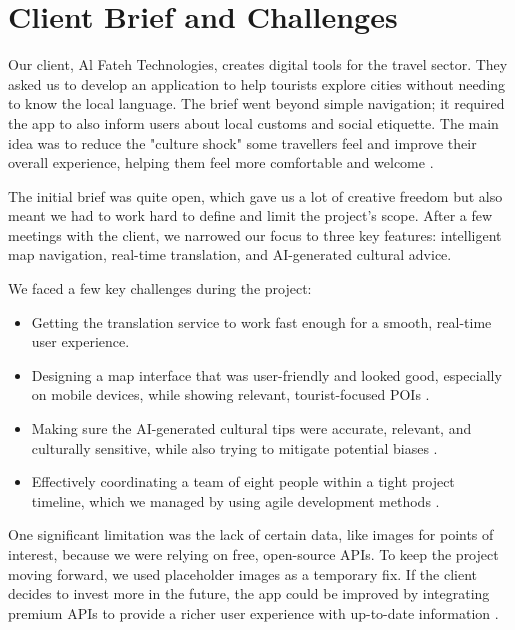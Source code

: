 \section{Client Brief and Challenges}

Our client, Al Fateh Technologies, creates digital tools for the travel sector. They asked us to develop an application to help tourists explore cities without needing to know the local language. The brief went beyond simple navigation; it required the app to also inform users about local customs and social etiquette. The main idea was to reduce the "culture shock" some travellers feel and improve their overall experience, helping them feel more comfortable and welcome \cite{culturegap}.

The initial brief was quite open, which gave us a lot of creative freedom but also meant we had to work hard to define and limit the project's scope. After a few meetings with the client, we narrowed our focus to three key features: intelligent map navigation, real-time translation, and AI-generated cultural advice.

We faced a few key challenges during the project:
\begin{itemize}
\item Getting the translation service to work fast enough for a smooth, real-time user experience.
\item Designing a map interface that was user-friendly and looked good, especially on mobile devices, while showing relevant, tourist-focused POIs \cite{uxTourism}.
\item Making sure the AI-generated cultural tips were accurate, relevant, and culturally sensitive, while also trying to mitigate potential biases \cite{aiBias}.
\item Effectively coordinating a team of eight people within a tight project timeline, which we managed by using agile development methods \cite{agileTeams}.
\end{itemize}

One significant limitation was the lack of certain data, like images for points of interest, because we were relying on free, open-source APIs. To keep the project moving forward, we used placeholder images as a temporary fix. If the client decides to invest more in the future, the app could be improved by integrating premium APIs to provide a richer user experience with up-to-date information \cite{crowdsourcing}.

